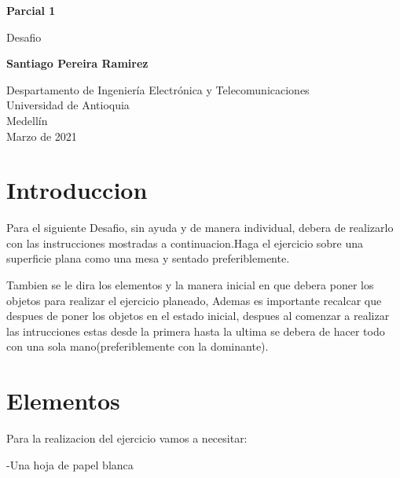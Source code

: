\documentclass{article}
\begin{document}
\begin{titlepage}
    \begin{center}
        \vspace*{1cm}
            
        \Huge
        \textbf{Parcial 1 }
            
        \vspace{0.5cm}
        \LARGE
        Desafio
            
        \vspace{1.5cm}
            
        \textbf{Santiago Pereira Ramirez}
            
        \vfill
            
        \vspace{0.8cm}
            
        \Large
        Despartamento de Ingeniería Electrónica y Telecomunicaciones\\
        Universidad de Antioquia\\
        Medellín\\
        Marzo de 2021
            
    \end{center}
\end{titlepage}

\tableofcontents
\newpage
\section{Introduccion }\label{intro}
Para el siguiente Desafio, sin ayuda y de manera individual, debera de realizarlo con las instrucciones mostradas a continuacion.Haga el ejercicio sobre una superficie plana como una mesa y sentado preferiblemente.

Tambien se le dira los elementos y la manera inicial en que debera poner los objetos para realizar el ejercicio planeado, Ademas es importante recalcar que despues de poner los objetos en el estado inicial, despues al comenzar a realizar las intrucciones estas desde la primera hasta la ultima se debera de hacer todo con una sola mano(preferiblemente con la dominante).

\section{Elementos} \label{contenido}
Para la realizacion del ejercicio vamos a necesitar:

    -Una hoja de papel blanca
    
\end{document}

